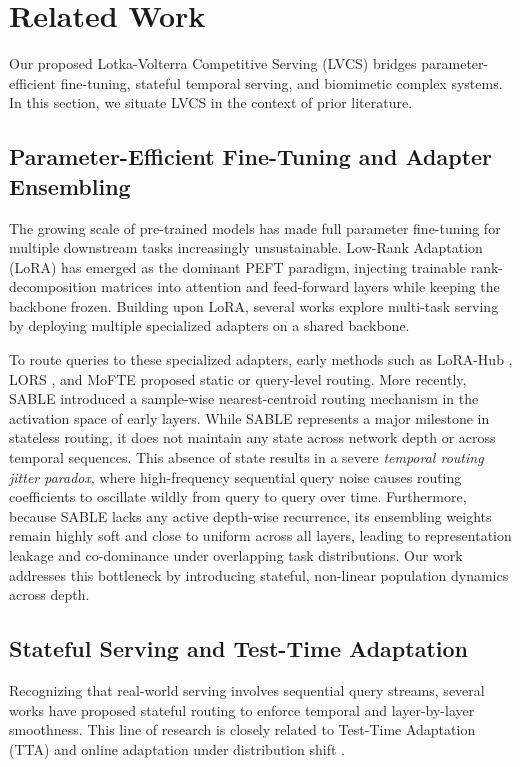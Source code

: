 \section{Related Work}
\label{sec:related_work}

Our proposed Lotka-Volterra Competitive Serving (LVCS) bridges parameter-efficient fine-tuning, stateful temporal serving, and biomimetic complex systems. In this section, we situate LVCS in the context of prior literature.

\subsection{Parameter-Efficient Fine-Tuning and Adapter Ensembling}
The growing scale of pre-trained models has made full parameter fine-tuning for multiple downstream tasks increasingly unsustainable. Low-Rank Adaptation (LoRA) \cite{hu2021lora} has emerged as the dominant PEFT paradigm, injecting trainable rank-decomposition matrices into attention and feed-forward layers while keeping the backbone frozen. Building upon LoRA, several works explore multi-task serving by deploying multiple specialized adapters on a shared backbone.

To route queries to these specialized adapters, early methods such as LoRA-Hub \cite{lora-hub}, LORS \cite{lors}, and MoFTE \cite{mofte} proposed static or query-level routing. More recently, SABLE \cite{sable} introduced a sample-wise nearest-centroid routing mechanism in the activation space of early layers. While SABLE represents a major milestone in stateless routing, it does not maintain any state across network depth or across temporal sequences. This absence of state results in a severe \emph{temporal routing jitter paradox}, where high-frequency sequential query noise causes routing coefficients to oscillate wildly from query to query over time. Furthermore, because SABLE lacks any active depth-wise recurrence, its ensembling weights remain highly soft and close to uniform across all layers, leading to representation leakage and co-dominance under overlapping task distributions. Our work addresses this bottleneck by introducing stateful, non-linear population dynamics across depth.

\subsection{Stateful Serving and Test-Time Adaptation}
Recognizing that real-world serving involves sequential query streams, several works have proposed stateful routing to enforce temporal and layer-by-layer smoothness. This line of research is closely related to Test-Time Adaptation (TTA) \cite{wang2020tent, zhang2022memo} and online adaptation under distribution shift \cite{shao2023test, lopez2017gradient}. 

